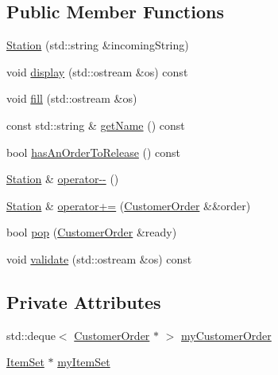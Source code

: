 \subsection*{Public Member Functions}
\begin{DoxyCompactItemize}
\item 
\mbox{\hyperlink{classsict_1_1Station_a95b3910ac2cf806fed948b473c870e64}{Station}} (std\+::string \&incoming\+String)
\item 
void \mbox{\hyperlink{classsict_1_1Station_a83b3f64c0c2063a730a14888869b022d}{display}} (std\+::ostream \&os) const
\item 
void \mbox{\hyperlink{classsict_1_1Station_ad81558c1e92485344e5d0b1b773b0fae}{fill}} (std\+::ostream \&os)
\item 
const std\+::string \& \mbox{\hyperlink{classsict_1_1Station_aa35cfe52f0f33ef1399f6b4b6f5ed91f}{get\+Name}} () const
\item 
bool \mbox{\hyperlink{classsict_1_1Station_a9e892b3c93dd2163d1c6569dba6c8536}{has\+An\+Order\+To\+Release}} () const
\item 
\mbox{\hyperlink{classsict_1_1Station}{Station}} \& \mbox{\hyperlink{classsict_1_1Station_ab5c0ac9d9ccdd92469542a49e3c01e05}{operator-\/-\/}} ()
\item 
\mbox{\hyperlink{classsict_1_1Station}{Station}} \& \mbox{\hyperlink{classsict_1_1Station_acd6e5d1500de14a981885e060b31d5ca}{operator+=}} (\mbox{\hyperlink{classsict_1_1CustomerOrder}{Customer\+Order}} \&\&order)
\item 
bool \mbox{\hyperlink{classsict_1_1Station_a583745c920a8fd95aaaf84ef2d96a993}{pop}} (\mbox{\hyperlink{classsict_1_1CustomerOrder}{Customer\+Order}} \&ready)
\item 
void \mbox{\hyperlink{classsict_1_1Station_a93da83c7e33b4b336225cc4753ee91da}{validate}} (std\+::ostream \&os) const
\end{DoxyCompactItemize}
\subsection*{Private Attributes}
\begin{DoxyCompactItemize}
\item 
std\+::deque$<$ \mbox{\hyperlink{classsict_1_1CustomerOrder}{Customer\+Order}} $\ast$ $>$ \mbox{\hyperlink{classsict_1_1Station_a82773fd8f7c3e60dfdec18fb9cde0e23}{my\+Customer\+Order}}
\item 
\mbox{\hyperlink{classsict_1_1ItemSet}{Item\+Set}} $\ast$ \mbox{\hyperlink{classsict_1_1Station_aaf7c62274d4e6cd3c9f76d7f2f7625b6}{my\+Item\+Set}}
\end{DoxyCompactItemize}


